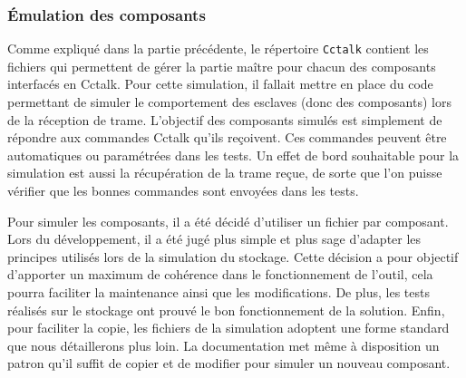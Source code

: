 \documentclass[a4paper]{article}
\begin{document}
\subsubsection{Émulation des composants}

Comme expliqué dans la partie précédente, le répertoire \verb|Cctalk| contient
les fichiers qui permettent de gérer la partie maître pour chacun des
composants interfacés en Cctalk. Pour cette simulation, il fallait mettre en
place du code permettant de simuler le comportement des esclaves (donc des
composants) lors de la réception de trame. L'objectif des composants simulés est
simplement de répondre aux commandes Cctalk qu'ils reçoivent. Ces commandes
peuvent être automatiques ou paramétrées dans les tests. Un effet de bord
souhaitable pour la simulation est aussi la récupération de la trame reçue, de sorte
que l'on puisse vérifier que les bonnes commandes sont envoyées dans les tests.

Pour simuler les composants, il a été décidé d'utiliser un fichier par
composant. Lors du développement, il a été jugé plus simple et plus sage
d'adapter les principes utilisés lors de la simulation du stockage. Cette
décision a pour objectif d'apporter un maximum de cohérence dans le
fonctionnement de l'outil, cela pourra faciliter la maintenance ainsi que les
modifications. De plus, les tests réalisés sur le stockage ont prouvé le bon
fonctionnement de la solution. Enfin, pour faciliter la copie, les fichiers de
la simulation adoptent une forme standard que nous détaillerons plus loin. La
documentation met même à disposition un patron qu'il suffit de copier et de
modifier pour simuler un nouveau composant.
\end{document}
